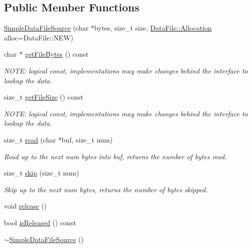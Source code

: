 \subsection*{Public Member Functions}
\begin{DoxyCompactItemize}
\item 
\hyperlink{classBUSBOY_1_1SimpleDataFileSource_a9a3def3020e88a029993d45ada5e6529}{SimpleDataFileSource} (char $\ast$bytes, size\_\-t size, \hyperlink{classBUSBOY_1_1DataFile_aff6de50b1c1e19698f0b4fdf2c62e02b}{DataFile::Allocation} alloc=DataFile::NEW)
\item 
char $\ast$ \hyperlink{classBUSBOY_1_1SimpleDataFileSource_a6811ed0b59217747b60a7deffbf6f991}{getFileBytes} () const 
\begin{DoxyCompactList}\small\item\em NOTE: logical const, implementations may make changes behind the interface to lookup the data. \item\end{DoxyCompactList}\item 
size\_\-t \hyperlink{classBUSBOY_1_1SimpleDataFileSource_a3a88ad0f428efbe004f864d67ed642f1}{getFileSize} () const 
\begin{DoxyCompactList}\small\item\em NOTE: logical const, implementations may make changes behind the interface to lookup the data. \item\end{DoxyCompactList}\item 
size\_\-t \hyperlink{classBUSBOY_1_1SimpleDataFileSource_ab3d357e13ac2707123f42e32184549d9}{read} (char $\ast$buf, size\_\-t num)
\begin{DoxyCompactList}\small\item\em Read up to the next num bytes into buf, returns the number of bytes read. \item\end{DoxyCompactList}\item 
size\_\-t \hyperlink{classBUSBOY_1_1SimpleDataFileSource_ad0cd565fa57bdac5f9d1c971590dbe2b}{skip} (size\_\-t num)
\begin{DoxyCompactList}\small\item\em Skip up to the next num bytes, returns the number of bytes skipped. \item\end{DoxyCompactList}\item 
void \hyperlink{classBUSBOY_1_1SimpleDataFileSource_a941e4ec1d63751ff8c5cb4b6b8c3b2cf}{release} ()
\item 
bool \hyperlink{classBUSBOY_1_1SimpleDataFileSource_acd353a3343831533682d6f1dd6122573}{isReleased} () const 
\item 
\hyperlink{classBUSBOY_1_1SimpleDataFileSource_a0ce9aa80189e52f3c457ded051f1eaf8}{$\sim$SimpleDataFileSource} ()
\end{DoxyCompactItemize}


